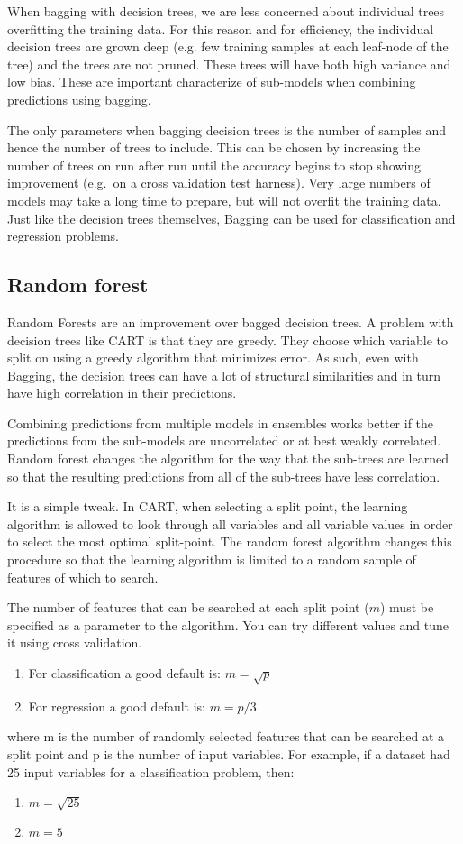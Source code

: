 \documentclass{article}
\begin{document}
When bagging with decision trees, we are less concerned about individual trees overfitting the training data. For this reason and for efficiency, the individual decision trees are grown deep (e.g. few training samples at each leaf-node of the tree) and the trees are not pruned. These trees will have both high variance and low bias. These are important characterize of sub-models when combining predictions using bagging.

The only parameters when bagging decision trees is the number of samples and hence the number of trees to include. This can be chosen by increasing the number of trees on run after run until the accuracy begins to stop showing improvement (e.g.\ on a cross validation test harness). Very large numbers of models may take a long time to prepare, but will not overfit the training data.
Just like the decision trees themselves, Bagging can be used for classification and regression problems.

\subsection{Random forest}
Random Forests are an improvement over bagged decision trees. A problem with decision trees like CART is that they are greedy. They choose which variable to split on using a greedy algorithm that minimizes error. As such, even with Bagging, the decision trees can have a lot of structural similarities and in turn have high correlation in their predictions.

Combining predictions from multiple models in ensembles works better if the predictions from the sub-models are uncorrelated or at best weakly correlated. Random forest changes the algorithm for the way that the sub-trees are learned so that the resulting predictions from all of the sub-trees have less correlation.

It is a simple tweak. In CART, when selecting a split point, the learning algorithm is allowed to look through all variables and all variable values in order to select the most optimal split-point. The random forest algorithm changes this procedure so that the learning algorithm is limited to a random sample of features of which to search.

The number of features that can be searched at each split point ($m$) must be specified as a parameter to the algorithm. You can try different values and tune it using cross validation.
\begin{enumerate} \addtolength{\itemsep}{-0.5\baselineskip}
\item For classification a good default is: $m = \sqrt{p}$
\item For regression a good default is: $m = p/3$
\end{enumerate}
where m is the number of randomly selected features that can be searched at a split point and p is the number of input variables. For example, if a dataset had 25 input variables for a classification problem, then:
\begin{enumerate} \addtolength{\itemsep}{-0.5\baselineskip}
\item $m = \sqrt{25}$
\item $m = 5$
\end{enumerate}
\end{document}
